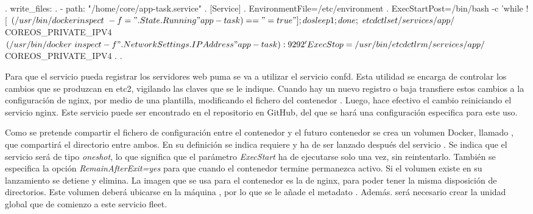 \begin{codelisting}
\label{code:execstartpost-app-task}
\begin{code}
.
write_files:
.
  - path: "/home/core/app-task.service"
    .
    [Service] 
      .     
      EnvironmentFile=/etc/environment
      .
      ExecStartPost=/bin/bash -c 'while ! [ $(/usr/bin/docker inspect \
      -f ="{{.State.Running}}" app-task) == "=true" ]; do sleep 1; done; \
      etcdctl set /services/app/${COREOS_PRIVATE_IPV4} $(/usr/bin/docker \
      inspect -f "{{ .NetworkSettings.IPAddress }}" app-task):9292'
      ExecStop=/usr/bin/etcdctl rm /services/app/${COREOS_PRIVATE_IPV4}
      .
.
\end{code}
\end{codelisting}

Para que el servicio  pueda registrar los servidores web puma se va a utilizar el servicio confd. Esta utilidad se encarga de controlar los cambios que se produzcan en etc2, vigilando las claves que se le indique. Cuando hay un nuevo registro o baja transfiere estos cambios a la configuración de nginx, por medio de una plantilla, modificando el fichero  del contenedor . Luego, hace efectivo el cambio reiniciando el servicio nginx. Este servicio puede ser encontrado en el repositorio  en GitHub, del que se hará una configuración especifica para este uso.

Como se pretende compartir el fichero de configuración  entre el contenedor  y el futuro contenedor  se crea un volumen Docker, llamado , que compartirá el directorio  entre ambos. En su definición se indica requiere y ha de ser lanzado después del servicio . Se indica que el servicio será de tipo \textit{oneshot}, lo que significa que el parámetro \textit{ExecStart} ha de ejecutarse solo una vez, sin reintentarlo. También se especifica la opción \textit{RemainAfterExit=yes} para que cuando el contenedor termine permanezca activo. Si el volumen existe en su lanzamiento se detiene y elimina. La imagen que se usa para el contenedor es la de nginx, para poder tener la misma disposición de directorios. Este volumen deberá ubicarse en la máquina , por lo que se le añade el metadato . Además. será necesario crear la unidad global  que de comienzo a este servicio fleet.

